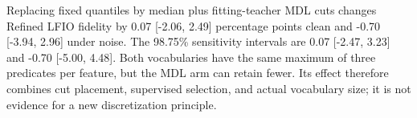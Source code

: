 Replacing fixed quantiles by median plus fitting-teacher MDL cuts changes Refined LFIO fidelity by 0.07 [-2.06, 2.49] percentage points clean and -0.70 [-3.94, 2.96] under noise. The 98.75\% sensitivity intervals are 0.07 [-2.47, 3.23] and -0.70 [-5.00, 4.48]. Both vocabularies have the same maximum of three predicates per feature, but the MDL arm can retain fewer. Its effect therefore combines cut placement, supervised selection, and actual vocabulary size; it is not evidence for a new discretization principle.
